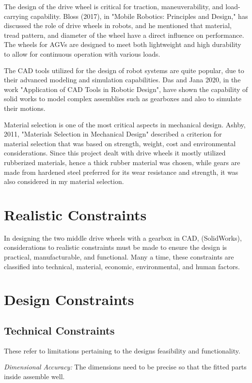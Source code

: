 \documentclass[../../main]{subfiles}
\begin{document}
The design of the drive wheel is critical for traction, maneuverability,
and load-carrying capability. Bloss (2017), in "Mobile Robotics:
Principles and Design," has discussed the role of drive wheels in
robots, and he mentioned that material, tread pattern, and diameter of
the wheel have a direct influence on performance. The wheels for AGVs
are designed to meet both lightweight and high durability to allow for
continuous operation with various loads.

The CAD tools utilized for the design of robot systems are quite
popular, due to their advanced modeling and simulation capabilities. Das
and Jana 2020, in the work "Application of CAD Tools in Robotic Design",
have shown the capability of solid works to model complex assemblies
such as gearboxes and also to simulate their motions.

Material selection is one of the most critical aspects in mechanical
design. Ashby, 2011, "Materials Selection in Mechanical Design"
described a criterion for material selection that was based on strength,
weight, cost and environmental considerations. Since this project dealt
with drive wheels it mostly utilized rubberized materials, hence a thick
rubber material was chosen, while gears are made from hardened steel
preferred for its wear resistance and strength, it was also considered
in my material selection.

\section{ Realistic Constraints}

In designing the two middle drive wheels with a gearbox in CAD,
(SolidWorks), considerations to realistic constraints must be made to
ensure the design is practical, manufacturable, and functional. Many a
time, these constraints are classified into technical, material,
economic, environmental, and human factors.
\section{Design Constraints}
\subsection{Technical Constraints}

These refer to limitations pertaining to the design\textquotesingle s
feasibility and functionality.

\emph{Dimensional Accuracy:} The dimensions need to be precise so that
the fitted parts inside assemble well.
\end{document}
